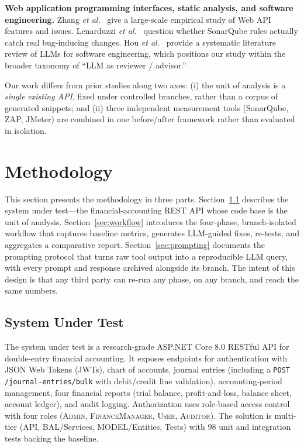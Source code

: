 \documentclass[conference,letterpaper]{IEEEtran}
\begin{document}
\textbf{Web application programming interfaces, static analysis, and software engineering.} Zhang \textit{et al.}~\cite{ref5} give a large-scale empirical study of Web API features and issues. Lenarduzzi \textit{et al.}~\cite{ref15} question whether SonarQube rules actually catch real bug-inducing changes. Hou \textit{et al.}~\cite{ref14} provide a systematic literature review of LLMs for software engineering, which positions our study within the broader taxonomy of ``LLM as reviewer / advisor.''

Our work differs from prior studies along two axes: (i) the unit of analysis is a \emph{single existing API}, fixed under controlled branches, rather than a corpus of generated snippets; and (ii) three independent measurement tools (SonarQube, ZAP, JMeter) are combined in one before/after framework rather than evaluated in isolation.

\section{Methodology}
This section presents the methodology in three parts. Section~\ref{sec:sut} describes the system under test---the financial-accounting REST API whose code base is the unit of analysis. Section~\ref{sec:workflow} introduces the four-phase, branch-isolated workflow that captures baseline metrics, generates LLM-guided fixes, re-tests, and aggregates a comparative report. Section~\ref{sec:prompting} documents the prompting protocol that turns raw tool output into a reproducible LLM query, with every prompt and response archived alongside its branch. The intent of this design is that any third party can re-run any phase, on any branch, and reach the same numbers.

\subsection{System Under Test}\label{sec:sut}
The system under test is a research-grade ASP.NET Core 8.0 RESTful API for double-entry financial accounting. It exposes endpoints for authentication with JSON Web Tokens (JWTs), chart of accounts, journal entries (including a \texttt{POST /journal-entries/bulk} with debit/credit line validation), accounting-period management, four financial reports (trial balance, profit-and-loss, balance sheet, account ledger), and audit logging. Authorization uses role-based access control with four roles (\textsc{Admin}, \textsc{FinanceManager}, \textsc{User}, \textsc{Auditor}). The solution is multi-tier (API, BAL/Services, MODEL/Entities, Tests) with 98 unit and integration tests backing the baseline.
\end{document}
